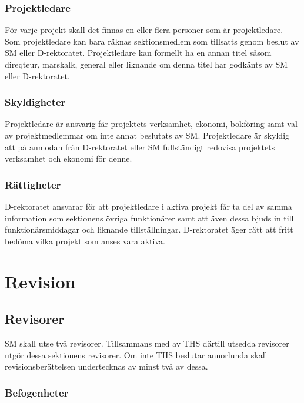 \documentclass{dgovdoc}
\begin{document}
\subsubsection{Projektledare}

För varje projekt skall det finnas en eller flera personer som är
projektledare. Som projektledare kan bara räknas sektionsmedlem som tillsatts
genom beslut av SM eller D-rektoratet. Projektledare kan formellt ha en annan
titel såsom direqteur, marskalk, general eller liknande om denna titel har
godkänts av SM eller D-rektoratet.

\subsubsection{Skyldigheter}

Projektledare är ansvarig fär projektets verksamhet, ekonomi, bokföring samt
val av projektmedlemmar om inte annat beslutats av SM. Projektledare är
skyldig att på anmodan från D-rektoratet eller SM fullständigt redovisa
projektets verksamhet och ekonomi för denne.

\subsubsection{Rättigheter}

D-rektoratet ansvarar för att projektledare i aktiva projekt får ta del av
samma information som sektionens övriga funktionärer samt att även dessa bjuds
in till funktionärsmiddagar och liknande tillställningar. D-rektoratet äger
rätt att fritt bedöma vilka projekt som anses vara aktiva.

\section{Revision}

\subsection{Revisorer}
\label{sec:revisorer}

SM skall utse två revisorer. Tillsammans med av THS därtill utsedda revisorer
utgör dessa sektionens revisorer. Om inte THS beslutar annorlunda skall
revisionsberättelsen undertecknas av minst två av dessa.

\subsubsection{Befogenheter}
\end{document}
